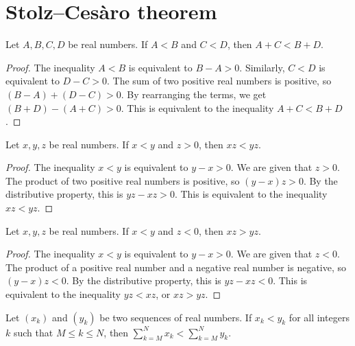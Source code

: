 \chapter{Stolz–Cesàro theorem}

\begin{lemma}
    \label{lem:Addition_of_Strict_Inequalities_Property}
    Let $A, B, C, D$ be real numbers. If $A < B$ and $C < D$, then $A + C < B + D$.
\end{lemma}

\begin{proof}
    The inequality $A < B$ is equivalent to $B - A > 0$. Similarly, $C < D$ is equivalent to $D - C > 0$.
    The sum of two positive real numbers is positive, so $(B - A) + (D - C) > 0$.
    By rearranging the terms, we get $(B + D) - (A + C) > 0$.
    This is equivalent to the inequality $A + C < B + D$.
\end{proof}

\begin{lemma}
    \label{lem:Multiplication_by_Positive}
    Let $x, y, z$ be real numbers. If $x < y$ and $z > 0$, then $xz < yz$.
\end{lemma}

\begin{proof}
    The inequality $x < y$ is equivalent to $y - x > 0$.
    We are given that $z > 0$. The product of two positive real numbers is positive, so $(y - x)z > 0$.
    By the distributive property, this is $yz - xz > 0$.
    This is equivalent to the inequality $xz < yz$.
\end{proof}

\begin{lemma}
    \label{lem:Multiplication_by_Negative}
    Let $x, y, z$ be real numbers. If $x < y$ and $z < 0$, then $xz > yz$.
\end{lemma}

\begin{proof}
    The inequality $x < y$ is equivalent to $y - x > 0$.
    We are given that $z < 0$. The product of a positive real number and a negative real number is negative, so $(y - x)z < 0$.
    By the distributive property, this is $yz - xz < 0$.
    This is equivalent to the inequality $yz < xz$, or $xz > yz$.
\end{proof}

\begin{lemma}
    \label{lem:Additivity_of_Strict_Inequalities}
    Let $(x_k)$ and $(y_k)$ be two sequences of real numbers. If $x_k < y_k$ for all integers $k$ such that $M \le k \le N$, then $\sum_{k=M}^{N} x_k < \sum_{k=M}^{N} y_k$.
\end{lemma}


